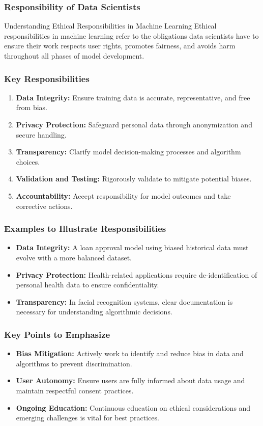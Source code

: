 \documentclass{beamer}
\begin{document}
\begin{frame}[fragile]
    \frametitle{Responsibility of Data Scientists}
    \begin{block}{Understanding Ethical Responsibilities in Machine Learning}
        Ethical responsibilities in machine learning refer to the obligations data scientists have to ensure their work respects user rights, promotes fairness, and avoids harm throughout all phases of model development.
    \end{block}
\end{frame}

\begin{frame}[fragile]
    \frametitle{Key Responsibilities}
    \begin{enumerate}
        \item \textbf{Data Integrity:} Ensure training data is accurate, representative, and free from bias.
        \item \textbf{Privacy Protection:} Safeguard personal data through anonymization and secure handling.
        \item \textbf{Transparency:} Clarify model decision-making processes and algorithm choices.
        \item \textbf{Validation and Testing:} Rigorously validate to mitigate potential biases.
        \item \textbf{Accountability:} Accept responsibility for model outcomes and take corrective actions.
    \end{enumerate}
\end{frame}

\begin{frame}[fragile]
    \frametitle{Examples to Illustrate Responsibilities}
    \begin{itemize}
        \item \textbf{Data Integrity:} A loan approval model using biased historical data must evolve with a more balanced dataset.
        \item \textbf{Privacy Protection:} Health-related applications require de-identification of personal health data to ensure confidentiality.
        \item \textbf{Transparency:} In facial recognition systems, clear documentation is necessary for understanding algorithmic decisions.
    \end{itemize}
\end{frame}

\begin{frame}[fragile]
    \frametitle{Key Points to Emphasize}
    \begin{itemize}
        \item \textbf{Bias Mitigation:} Actively work to identify and reduce bias in data and algorithms to prevent discrimination.
        \item \textbf{User Autonomy:} Ensure users are fully informed about data usage and maintain respectful consent practices.
        \item \textbf{Ongoing Education:} Continuous education on ethical considerations and emerging challenges is vital for best practices.
    \end{itemize}
\end{frame}
\end{document}
